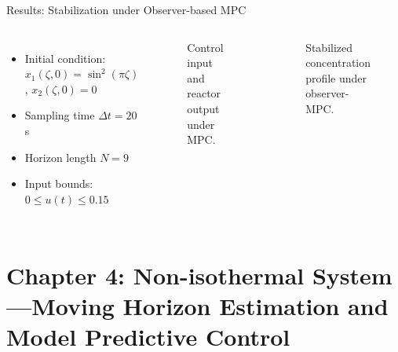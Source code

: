 \documentclass[8pt]{beamer}
\begin{document}
\begin{frame}{Results: Stabilization under Observer-based MPC}
\begin{columns}[t]
\begin{itemize}
    \item Initial condition: \( x_1(\zeta,0) = \sin^2(\pi \zeta) \), \( x_2(\zeta,0) = 0 \)
    \item Sampling time \( \Delta t = 20 \) s
    \item Horizon length \( N = 9 \)
    \item Input bounds: \( 0 \leq u(t) \leq 0.15 \)
\end{itemize}

\begin{figure}
    \centering
    \vspace{-2em}
    \caption{Control input and reactor output under MPC.}
\end{figure}

\vspace{-5mm}
\begin{figure}
    \centering
    \vspace{-2em}
    \caption{Stabilized concentration profile under observer-MPC.}
\end{figure}


\end{columns}

\end{frame}





\section{Chapter 4: Non-isothermal System---Moving Horizon Estimation and Model Predictive Control}
\end{document}
